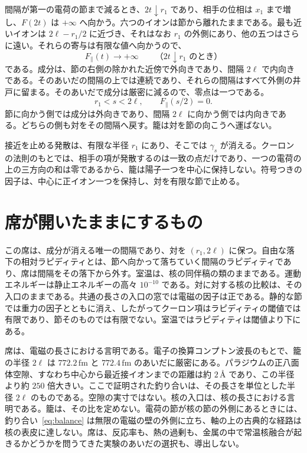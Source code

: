 \documentclass[a4paper]{article}
\begin{document}
間隔が第一の電荷の節まで減るとき、\(2t\downarrow r_1\) であり、相手の位相は \(x_1\) まで増し、\(F(2t)\) は \(+\infty\) へ向かう。六つのイオンは節から離れたままである。最も近いイオンは \(2\ell-r_1/2\) に近づき、それはなお \(r_1\) の外側にあり、他の五つはさらに遠い。それらの寄与は有限な値へ向かうので、
\begin{equation}
\label{eq:diverge}
F_{\parallel}(t)\to +\infty
\qquad\text{（\(2t\downarrow r_1\) のとき）}
\end{equation}
である。成分は、節の右側の除かれた近傍で外向きであり、間隔 \(2\ell\) で内向きである。そのあいだの間隔の上では連続であり、それらの間隔はすべて外側の井戸に留まる。そのあいだで成分は厳密に減るので、零点は一つである。
\begin{equation}
\label{eq:balance}
r_1<s<2\ell,
\qquad
F_{\parallel}(s/2)=0.
\end{equation}
節に向かう側では成分は外向きであり、間隔 \(2\ell\) に向かう側では内向きである。どちらの側も対をその間隔へ戻す。籠は対を節の向こうへ運ばない。

接近を止める発散は、有限な半径 \(r_1\) にあり、そこでは \(\gamma_s\) が消える。クーロンの法則のもとでは、相手の項が発散するのは一致の点だけであり、一つの電荷の上の三方向の和は零であるから、籠は陽子一つを中心に保持しない。符号つきの因子は、中心に正イオン一つを保持し、対を有限な節で止める。

\section{席が開いたままにするもの}
\label{sec:open}

この席は、成分が消える唯一の間隔であり、対を \((r_1,2\ell)\) に保つ。自由な落下の相対ラピディティとは、節へ向かって落ちていく間隔のラピディティであり、席は間隔をその落下から外す。室温は、核の同伴稿の類のままである。運動エネルギーは静止エネルギーの高々 \(10^{-10}\) である。対に対する核の比較は、その入口のままである。共通の長さの入口の窓では電磁の因子は正である。静的な節では重力の因子とともに消え、したがってクーロン項はラピディティの閾値では有限であり、節そのものでは有限でない。室温ではラピディティは閾値より下にある。

席は、電磁の長さにおける言明である。電子の換算コンプトン波長のもとで、籠の半径 \(2\ell\) は \(772.2\,\mathrm{fm}\) と \(772.4\,\mathrm{fm}\) のあいだに厳密にある。パラジウムの正八面体空隙、すなわち中心から最近接イオンまでの距離は約 \(2\,\text{\AA}\) であり、この半径より約 \(250\) 倍大きい。ここで証明された釣り合いは、その長さを単位とした半径 \(2\ell\) のものである。空隙の実寸ではない。核の入口は、核の長さにおける言明である。籠は、その比を定めない。電荷の節が核の節の外側にあるときには、釣り合い~\eqref{eq:balance} は無限の電磁の壁の外側に立ち、軸の上の古典的な経路は核の表皮に達しない。席は、反応率も、熱の過剰も、金属の中で常温核融合が起きるかどうかを問うてきた実験のあいだの選択も、導出しない。
\end{document}
